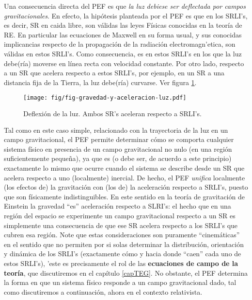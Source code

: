 Una consecuencia directa del PEF es que \textit{la luz debiese ser deflectada por campos gravitacionales}. En efecto, la hipótesis planteada por el PEF es que en los SRLI's, es decir, SR en caida libre, son válidas las leyes Físicas conocidas en la teoría de RE. En particular las ecuaciones de Maxwell en su forma usual, y sus conocidas implicancias respecto de la propagación de la radiación electromagn'etica, son válidas en estos SRLI's. Como consecuencia, es en estos SRLI's en los que la luz debe(ría) moverse en línea recta con velocidad constante. 
 Por otro lado, respecto a un SR que acelera respecto a estos SRLI's, por ejemplo, en un SR a una distancia fija de la Tierra, la luz debe(ría) curvarse. Ver figura \ref{fig:PEF-luz}.
\begin{figure}[H]
\centering\texttt{[image: fig/fig-gravedad-y-aceleracion-luz.pdf]}
\caption{Deflexión de la luz. Ambos SR's aceleran respecto a SRLI's.}
\label{fig:PEF-luz}
\end{figure}
Tal como en este caso simple, relacionado con la trayectoria de la luz en un campo gravitacional, el PEF permite determinar cómo se comporta cualquier sistema físico en presencia de un campo gravitacional no nulo (en una región suficientemente peque\~na), ya que es (o debe ser, de acuerdo a este principio) exactamente lo mismo que ocurre cuando el sistema se describe desde un SR que acelera respecto a uno (localmente) inercial. De hecho, el PEF \textit{unifica} localmente (los efectos de) la gravitación con (los de) la aceleración respecto a SRLI's, puesto que son físicamente indistinguibles. En este sentido en la teoría de gravitación de Einstein la gravedad ``es'' aceleración respecto a SLRI's: el hecho que en una región del espacio se experimente un campo gravitacional respecto a un SR es simplemente una consecuencia de que ese SR acelera respecto a los SRLI's que cubren esa región. Note que estas consideraciones son puramente ``cinemáticas'' en el sentido que no permiten por si solas determinar la distribución, orientación y dinámica de los SRLI's (exactamente cómo y hacia donde ``caen'' cada uno de estos SRLI's), 'este es precisamente el rol de las \textbf{ecuaciones de campo de la teoría}, que discutiremos en el capítulo \ref{capTEG}. No obstante, el PEF determina la forma en que un sistema físico responde a un campo gravitacional dado, tal como discutiremos a continuación, ahora en el contexto relativista.

